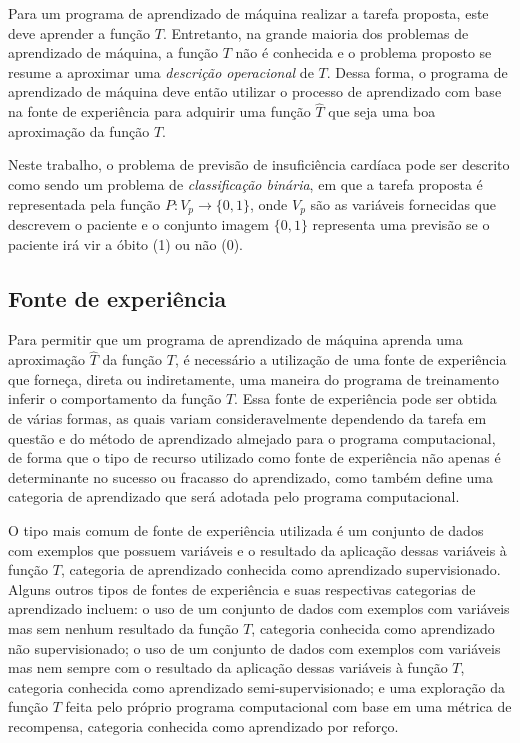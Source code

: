 Para um programa de aprendizado de máquina realizar a tarefa proposta, este deve aprender a função $T$. Entretanto, na grande maioria dos problemas de aprendizado de máquina, a função $T$ não é conhecida e o problema proposto se resume a aproximar uma \textit{descrição operacional} de $T$.\cite[p.8]{machine_learning} Dessa forma, o programa de aprendizado de máquina deve então utilizar o processo de aprendizado com base na fonte de experiência para adquirir uma função $\hat{T}$ que seja uma boa aproximação da função $T$.

Neste trabalho, o problema de previsão de insuficiência cardíaca pode ser descrito como sendo um problema de \textit{classificação binária}, em que a tarefa proposta é representada pela função $P : V_{p} \rightarrow \{0, 1\}$, onde $V_{p}$ são as variáveis fornecidas que descrevem o paciente e o conjunto imagem $\{0, 1\}$ representa uma previsão se o paciente irá vir a óbito (1) ou não (0).

\subsection{Fonte de experiência}

Para permitir que um programa de aprendizado de máquina aprenda uma aproximação $\hat{T}$ da função $T$, é necessário a utilização de uma fonte de experiência que forneça, direta ou indiretamente, uma maneira do programa de treinamento inferir o comportamento da função $T$. Essa fonte de experiência pode ser obtida de várias formas, as quais variam consideravelmente dependendo da tarefa em questão e do método de aprendizado almejado para o programa computacional, de forma que o tipo de recurso utilizado como fonte de experiência não apenas é determinante no sucesso ou fracasso do aprendizado, como também define uma categoria de aprendizado que será adotada pelo programa computacional.

O tipo mais comum de fonte de experiência utilizada é um conjunto de dados com exemplos que possuem variáveis e o resultado da aplicação dessas variáveis à função $T$, categoria de aprendizado conhecida como aprendizado supervisionado. Alguns outros tipos de fontes de experiência e suas respectivas categorias de aprendizado incluem: o uso de um conjunto de dados com exemplos com variáveis mas sem nenhum resultado da função $T$, categoria conhecida como aprendizado não supervisionado; o uso de um conjunto de dados com exemplos com variáveis mas nem sempre com o resultado da aplicação dessas variáveis à função $T$, categoria conhecida como aprendizado semi-supervisionado; e uma exploração da função $T$ feita pelo próprio programa computacional com base em uma métrica de recompensa, categoria conhecida como aprendizado por reforço.


